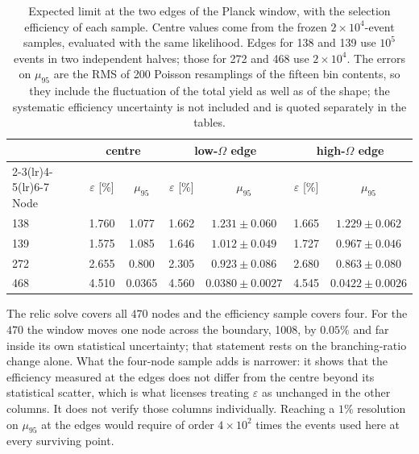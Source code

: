 \begin{table}[htbp]
\centering
\caption{Expected limit at the two edges of the Planck window, with the selection efficiency of each sample. Centre values come from the frozen $2\times10^4$-event samples, evaluated with the same likelihood. Edges for 138 and 139 use $10^5$ events in two independent halves; those for 272 and 468 use $2\times10^4$. The errors on $\mu_{95}$ are the RMS of 200 Poisson resamplings of the fifteen bin contents, so they include the fluctuation of the total yield as well as of the shape; the systematic efficiency uncertainty is not included and is quoted separately in the tables.}
\label{tab:endpoints}
\begin{tabular}{lcccccc}
\toprule
& \multicolumn{2}{c}{centre} & \multicolumn{2}{c}{low-$\Omega$ edge} & \multicolumn{2}{c}{high-$\Omega$ edge} \\
\cmidrule(lr){2-3}\cmidrule(lr){4-5}\cmidrule(lr){6-7}
Node & $\varepsilon$ [\%] & $\mu_{95}$ & $\varepsilon$ [\%] & $\mu_{95}$ & $\varepsilon$ [\%] & $\mu_{95}$ \\
\midrule
138 & 1.760 & 1.077 & 1.662 & $1.231\pm0.060$ & 1.665 & $1.229\pm0.062$ \\
139 & 1.575 & 1.085 & 1.646 & $1.012\pm0.049$ & 1.727 & $0.967\pm0.046$ \\
272 & 2.655 & 0.800 & 2.305 & $0.923\pm0.086$ & 2.680 & $0.863\pm0.080$ \\
468 & 4.510 & 0.0365 & 4.560 & $0.0380\pm0.0027$ & 4.545 & $0.0422\pm0.0026$ \\
\bottomrule
\end{tabular}
\end{table}

The relic solve covers all $470$ nodes and the efficiency sample covers four. For the $470$ the window moves one node across the boundary, 1008, by $0.05\%$ and far inside its own statistical uncertainty; that statement rests on the branching-ratio change alone. What the four-node sample adds is narrower: it shows that the efficiency measured at the edges does not differ from the centre beyond its statistical scatter, which is what licenses treating $\varepsilon$ as unchanged in the other columns. It does not verify those columns individually. Reaching a $1\%$ resolution on $\mu_{95}$ at the edges would require of order $4\times10^{2}$ times the events used here at every surviving point.
